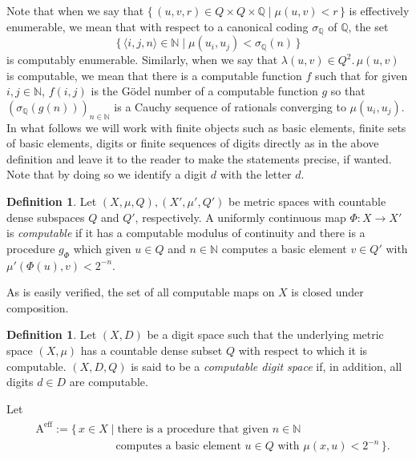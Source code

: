 \documentclass[microtype]{jloganal}
\theoremstyle{plain}
\theoremstyle{definition}
\newtheorem{definition}[theorem]{Definition}
\newcommand{\NN}{\mathbb{N}}
\newcommand{\QQ}{\mathbb{Q}}
\newcommand{\set}[2]{\mbox{$\{\,#1 \mid #2 \,\}$}}
\newcommand{\fun}[3]{\mbox{$#1 \colon #2 \rightarrow #3$}}
\newcommand{\pair}[1]{\langle #1 \rangle}
\newcommand{\cauchy}{\mathrm{A}}
\begin{document}
Note that when we say that $\set{(u, v, r) \in Q \times Q \times \QQ}{\mu(u, v) < r}$ is effectively enumerable, we mean that with respect to a canonical coding $\sigma_\QQ$ of $\QQ$, the set
\[
\set{\pair{i,j,n} \in \NN}{\mu(u_i, u_j) < \sigma_\QQ(n)}
\]
is computably enumerable. Similarly, when we say that $\lambda (u,v) \in Q^2.\, \mu(u, v)$ is computable, we mean that there is a computable function $f$ such that for given $i, j \in \NN$, $f(i,j)$ is the G\"odel number of a computable function $g$ so that $(\sigma_\QQ(g(n)))_{n \in \NN}$ is a Cauchy sequence of rationals converging to $\mu(u_i, u_j)$. In what follows we will work with  finite objects such as basic elements, finite sets of basic elements, digits or finite sequences of digits directly as in the above definition and leave it to the reader to make the statements precise, if wanted. Note that by doing so we identify a digit $d$ with the letter $d$. 

\begin{definition}
\label{def-dcomp}
Let $(X, \mu, Q), (X', \mu', Q')$ be metric spaces with countable dense subspaces $Q$ and $Q'$, respectively. A uniformly continuous map $\fun{\Phi}{X}{X'}$ is \emph{computable} if it has a computable modulus of continuity and there is a procedure $g_\Phi$ which given $u \in Q$ and $n \in \NN$ computes a basic element $v \in Q'$ with $\mu'(\Phi(u), v) < 2^{-n}$.
\end{definition}

As is easily verified, the set of all computable maps on $X$ is closed under composition.

\begin{definition}\label{def-compdigsp}
Let $(X,D)$ be a digit space such that the underlying metric space $(X, \mu)$ has a countable dense subset $Q$ with respect to which it is computable. $(X, D, Q)$ is said to be a \emph{computable digit space} if, in addition, all digits $d \in D$ are computable.
\end{definition}

Let 
\begin{gather*}
\begin{split}
&\cauchy^\text{eff} := \{\, x \in X \mid \text{there is a procedure that given $n \in \NN$}\\
&\hspace{3cm} \text{computes a basic element $u \in Q$ with $\mu(x, u) < 2^{-n}$} \,\}.
\end{split}
\end{gather*}
\end{document}
